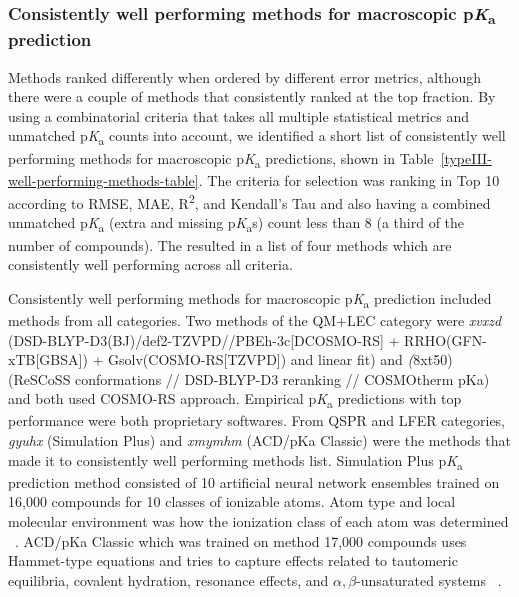 \documentclass[9pt,lineno,final]{elife}
\newcommand{\pKa}{p\textit{K}\textsubscript{a}}
\begin{document}
\subsubsection{Consistently well performing methods for macroscopic \pKa{} prediction}

Methods ranked differently when ordered by different error metrics, although there were a couple of methods that consistently ranked at the top fraction. 
By using a combinatorial criteria that takes all multiple statistical metrics and unmatched \pKa{} counts into account, we identified a short list of consistently well performing methods for macroscopic \pKa{} predictions, shown in Table~\ref{typeIII-well-performing-methods-table}. 
The criteria for selection was ranking in Top 10 according to RMSE, MAE, R\textsuperscript{2}, and Kendall's Tau and also having a combined unmatched \pKa{} (extra and missing \pKa{}s) count less than 8 (a third of the number of compounds).
The resulted in a list of four methods which are consistently well performing across all criteria.

Consistently well performing methods for macroscopic \pKa{} prediction included methods from all categories. Two methods of the QM+LEC category were \textit{xvxzd} (DSD-BLYP-D3(BJ)/def2-TZVPD//PBEh-3c[DCOSMO-RS] + RRHO(GFN-xTB[GBSA]) + Gsolv(COSMO-RS[TZVPD]) and linear fit) and \textit(8xt50) (ReSCoSS conformations // DSD-BLYP-D3 reranking // COSMOtherm pKa) and both used COSMO-RS approach. 
Empirical \pKa{} predictions with top performance were both proprietary softwares. 
From QSPR and LFER categories, \textit{gyuhx} (Simulation Plus) and \textit{xmymhm} (ACD/pKa Classic) were the methods that made it to consistently well performing methods list. Simulation Plus \pKa{} prediction method consisted of 10 artificial neural network ensembles trained on 16,000 compounds for 10 classes of ionizable atoms. Atom type and local molecular environment was how the ionization class of each atom was determined ~\citep{simulation_plus_D3R_presentation}. 
ACD/pKa Classic which was trained on method 17,000 compounds uses Hammet-type equations and tries to capture effects related to tautomeric equilibria, covalent hydration, resonance effects, and  $\alpha, \beta$-unsaturated systems ~\citep{ACD-pKa-classic}.
\end{document}
